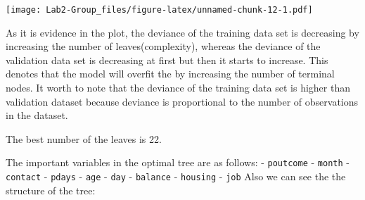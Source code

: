 \documentclass[
]{article}
\begin{document}
\texttt{[image: Lab2-Group\_files/figure-latex/unnamed-chunk-12-1.pdf]}

As it is evidence in the plot, the deviance of the training data set is
decreasing by increasing the number of leaves(complexity), whereas the
deviance of the validation data set is decreasing at first but then it
starts to increase. This denotes that the model will overfit the by
increasing the number of terminal nodes. It worth to note that the
deviance of the training data set is higher than validation dataset
because deviance is proportional to the number of observations in the
dataset.

The best number of the leaves is 22.

The important variables in the optimal tree are as follows: -
\texttt{poutcome} - \texttt{month} - \texttt{contact} - \texttt{pdays} -
\texttt{age} - \texttt{day} - \texttt{balance} - \texttt{housing} -
\texttt{job} Also we can see the the structure of the tree:
\end{document}
